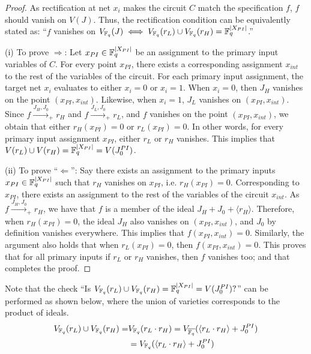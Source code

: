 \begin{proof}
As rectification at net $x_i$ makes the circuit $C$ match the
specification $f$, $f$ should vanish on $V(J)$. Thus, the
rectification condition can be equivalently stated as:
``$f$ vanishes on $V_{{\mathbb{F}}_{q}}(J) \iff V_{{\mathbb{F}}_{q}}(r_L) \cup V_{{\mathbb{F}}_{q}}(r_H) =
  {\mathbb{F}}_{q}^{|X_{PI}|}$.''

(i) To prove $\Rightarrow$: Let $x_{PI} \in {\mathbb{F}}_{q}^{|X_{PI}|}$ be an
assignment to the primary input variables of $C$. For every point
$x_{PI}$, there exists a corresponding assignment $x_{int}$ to the
rest of the variables of the circuit. For each primary input assignment,
the target net $x_i$ evaluates to either $x_i = 0$ or $x_i = 1$. When
$x_i = 0$, then $J_H$ vanishes on the point $(x_{PI},
x_{int})$. Likewise, when $x_i = 1$, $J_L$ vanishes on $(x_{PI},
x_{int})$. Since $f\xrightarrow{J_H,J_0}_+r_H$ and
$f\xrightarrow{J_L,J_0}_+r_L$, and $f$ vanishes on the point
$(x_{PI},x_{int})$, we obtain that either $r_H(x_{PI}) = 0$ or
$r_L(x_{PI}) = 0$. In other words, for every 
primary input assignment $x_{PI}$, either $r_L$ or $r_H$ vanishes. This
implies that $V(r_L) \cup V(r_H) = {\mathbb{F}}_{q}^{|X_{PI}|} = V(J_0^{PI})$.

(ii) To prove ``$\Leftarrow$'': Say there exists an assignment to the
primary inputs $x_{PI} \in {\mathbb{F}}_{q}^{|X_{PI}|}$ such that $r_H$ vanishes on
$x_{PI}$, i.e. $r_H(x_{PI})=0$. Corresponding to $x_{PI}$, there exists
an assignment to the rest of the variables of the circuit $x_{int}$. 
As $f\xrightarrow{J_H, J_0}_+ r_H$, we have that $f$ is a member of the
ideal $J_H + J_0 + \langle r_H \rangle$. Therefore, when
$r_H(x_{PI})=0$, the ideal $J_H$ also vanishes on $(x_{PI},x_{int})$,
and $J_0$ by definition vanishes everywhere. This implies that
$f(x_{PI},x_{int})=0$. Similarly, the argument also holds that when
$r_L(x_{PI})=0$, then $f(x_{PI},x_{int})=0$. This proves that for all
primary inputs if $r_L$ or $r_H$ vanishes, then $f$ vanishes too; and
that completes the proof.


  
\end{proof}

Note that the check ``Is $V_{{\mathbb{F}}_{q}}(r_L) \cup V_{{\mathbb{F}}_{q}}(r_H) =
{\mathbb{F}}_{q}^{|X_{PI}|} = V(J_0^{PI})?$'' can be performed as shown below,
where the union of varieties corresponds to the product of ideals.
\begin{align*}
 V_{{\mathbb{F}}_{q}}(r_L) \cup V_{{\mathbb{F}}_{q}}(r_H)  =&V_{{\mathbb{F}}_{q}}(r_L\cdot r_H) =
  V_{{\overline{{\mathbb{F}}_q}}}(\langle r_L\cdot r_H \rangle+ J_0^{PI}) \\
  &=V_{{\mathbb{F}}_{q}}(\langle r_L\cdot r_H \rangle+ J_0^{PI})
\end{align*}

